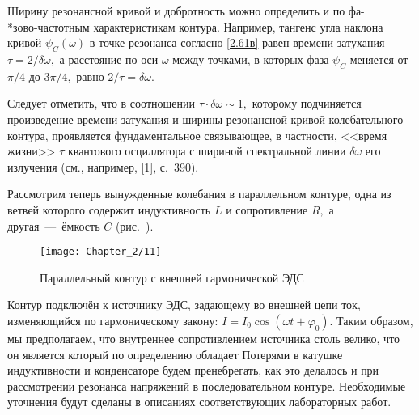 Ширину резонансной кривой и добротность можно определить и по фа-\\*зово-частотным характеристикам контура. Например, тангенс угла наклона кривой $\psi_C(\omega)$ в точке резонанса согласно \eqref{2.61в} равен времени затухания $\tau=2/\delta\omega,$ а расстояние по оси $\omega$ между точками, в которых фаза $\psi_C$ меняется от $\pi/4$ до $3\pi/4,$ равно $2/\tau=\delta\omega.$

Следует отметить, что в соотношении $\tau\cdot\delta\omega\sim1,$ которому подчиняется произведение времени затухания и ширины резонансной кривой колебательного контура, проявляется фундаментальное  связывающее, в частности, <<время жизни>> $\tau$ квантового осциллятора с шириной спектральной линии $\delta\omega$ его излучения (см., например, [1], с.~390).


Рассмотрим теперь вынужденные колебания в параллельном контуре, одна из ветвей которого содержит индуктивность $L$ и сопротивление $R,$ а другая~---~ёмкость $C$ (рис.~).
\begin{center}
	\begin{figure}[h!]
		\centering\texttt{[image: Chapter\_2/11]}
		\caption{Параллельный контур с внешней гармонической ЭДС}
	\end{figure}
\end{center}

Контур подключён к источнику ЭДС, задающему во внешней цепи ток, изменяющийся по гармоническому закону: $I=I_0\cos(\omega t+\varphi_0).$ Таким образом, мы предполагаем, что внутреннее сопротивлением источника столь велико, что он является  который по определению обладает  Потерями в катушке индуктивности и конденсаторе будем пренебрегать, как это делалось и при рассмотрении резонанса напряжений в последовательном контуре. Необходимые уточнения будут сделаны в описаниях соответствующих лабораторных работ.

